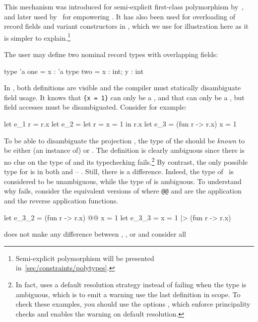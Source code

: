 \documentclass[acmsmall,screen,nonacm,review]{acmart}
\begin{document}
This mechanism was introduced for semi-explicit first-class
polymorphism by~\citet {Garrigue-Remy/poly-ml}, and later used
by~\citet {LeBotlan-Remy/recasting-mlf} for empowering \MLF. It has
also been used for overloading of record fields and variant
constructors in \OCaml, which we use for illustration here as it is
simpler to explain.\footnote {Semi-explicit polymorphism will be
  presented in~\cref{sec/constraints/polytypes}.}

The user may define two nominal record types with overlapping fields:
\begin{program}[input]
type 'a one = {x : 'a}
type two = {x : int; y : int}
\end{program}
In \OCaml, both definitions are visible and the compiler must
statically disambiguate field usage. It knows that \lstinline!{x = 1}! can
only be a , and that  can only be a ,
but field accesses  must be disambiguated. Consider for
example:
\begin{program}[input]
let e_1 r = r.x
let e_2 = let r = {x = 1} in r.x
let e_3 = (fun r -> r.x) {x = 1}
\end{program}
To be able to disambiguate the projection , the type of the
 should be \emph{known} to be either (an instance of)
 or . The definition  is
clearly ambiguous since there is no clue on the type of  and
its typechecking fails.\footnote {In fact, \OCaml uses a default
  resolution strategy instead of failing when the type is ambiguous,
  which is to emit a warning use the last definition in scope. To
  check these examples, you should use the options , which enforce principality checks and enables the warning on
  default resolution.}
By contrast, the only possible type for  is 
in both  and  -- . Still, there is a difference. Indeed, the type
of~ is considered to be unambiguous, while the type of
 is ambiguous.
%
To understand why  fails, consider the equivalent versions of
 where \texttt{@@} and \ocaml{|>} are the application and the
reverse application functions.
\begin{program}[input,escapechar={}]
let e_3_2 = (fun r -> r.x) @@ {x = 1}
let e_3_3 = {x = 1} |> (fun r -> r.x)
\end{program}
\OCaml does not make any difference between ,
, or  and consider all
\end{document}
